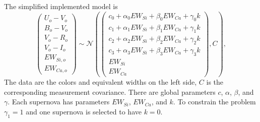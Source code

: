 \documentclass[11pt, oneside]{article}   	%
\begin{document}
The simplified implemented model is
\begin{equation}
\left(
\begin{matrix}
U_o-V_o\\B_o-V_o\\V_o-R_o\\V_o-I_o\\EW_{Si, o}\\ EW_{Ca, o}
\end{matrix}
\right) \sim \mathcal{N}
\left(
\left(
\begin{matrix}
c_0+\alpha_0 EW_{Si} + \beta_0 EW_{Ca} +\gamma_0 k  \\
c_1+\alpha_1 EW_{Si} + \beta_1 EW_{Ca}  +\gamma_1 k  \\
c_2+\alpha_2 EW_{Si} + \beta_2 EW_{Ca} +\gamma_2 k\\
c_3+\alpha_3 EW_{Si} + \beta_3 EW_{Ca} +\gamma_3 k\\
EW_{Si}\\ EW_{Ca}
\end{matrix}
\right)
,C
\right),
\end{equation}
The data are the colors and equivalent widths on the left side, $C$ is the corresponding measurement
covariance.  There are global parameters $c$, $\alpha$, $\beta$, and $\gamma$.  Each
supernova has parameters $EW_{Si}$, $EW_{Ca}$, and $k$.  To constrain the problem $\gamma_1=1$ and one supernova is selected to have
$k=0$.
\end{document}
